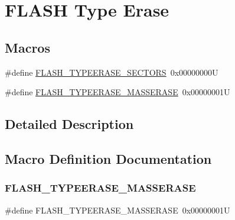 \hypertarget{group___f_l_a_s_h_ex___type___erase}{}\section{F\+L\+A\+SH Type Erase}
\label{group___f_l_a_s_h_ex___type___erase}
\subsection*{Macros}
\begin{DoxyCompactItemize}
\item 
\#define \mbox{\hyperlink{group___f_l_a_s_h_ex___type___erase_gaee700cbbc746cf72fca3ebf07ee20c4e}{F\+L\+A\+S\+H\+\_\+\+T\+Y\+P\+E\+E\+R\+A\+S\+E\+\_\+\+S\+E\+C\+T\+O\+RS}}~0x00000000U
\item 
\#define \mbox{\hyperlink{group___f_l_a_s_h_ex___type___erase_ga9bc03534e69c625e1b4f0f05c3852243}{F\+L\+A\+S\+H\+\_\+\+T\+Y\+P\+E\+E\+R\+A\+S\+E\+\_\+\+M\+A\+S\+S\+E\+R\+A\+SE}}~0x00000001U
\end{DoxyCompactItemize}


\subsection{Detailed Description}


\subsection{Macro Definition Documentation}
\mbox{\label{group___f_l_a_s_h_ex___type___erase_ga9bc03534e69c625e1b4f0f05c3852243}} 
\subsubsection{\texorpdfstring{F\+L\+A\+S\+H\+\_\+\+T\+Y\+P\+E\+E\+R\+A\+S\+E\+\_\+\+M\+A\+S\+S\+E\+R\+A\+SE}{FLASH\_TYPEERASE\_MASSERASE}}
{\footnotesize\ttfamily \#define F\+L\+A\+S\+H\+\_\+\+T\+Y\+P\+E\+E\+R\+A\+S\+E\+\_\+\+M\+A\+S\+S\+E\+R\+A\+SE~0x00000001U}

